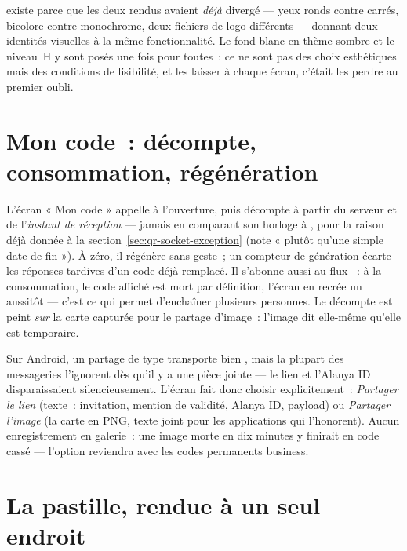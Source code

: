 \begin{note}
 existe parce que les deux rendus avaient \emph{déjà} divergé
--- yeux ronds contre carrés, bicolore contre monochrome, deux fichiers de logo différents
--- donnant deux identités visuelles à la même fonctionnalité. Le fond blanc en thème
sombre et le niveau~H y sont posés une fois pour toutes~: ce ne sont pas des choix
esthétiques mais des conditions de lisibilité, et les laisser à chaque écran, c'était les
perdre au premier oubli.
\end{note}

\section{Mon code~: décompte, consommation, régénération}

L'écran « Mon code » appelle  à l'ouverture, puis décompte à
partir du  serveur et de l'\emph{instant de réception} --- jamais en
comparant son horloge à , pour la raison déjà donnée à la
section~\ref{sec:qr-socket-exception} (note «  plutôt qu'une simple date de
fin »). À zéro, il régénère sans geste~; un compteur de génération écarte les réponses
tardives d'un code déjà remplacé. Il s'abonne aussi au flux ~: à la
consommation, le code affiché est mort par définition, l'écran en recrée un aussitôt ---
c'est ce qui permet d'enchaîner plusieurs personnes. Le décompte est peint \emph{sur} la
carte capturée pour le partage d'image~: l'image dit elle-même qu'elle est temporaire.

\begin{note}
Sur Android, un partage de type  transporte bien , mais
la plupart des messageries l'ignorent dès qu'il y a une pièce jointe --- le lien et
l'Alanya ID disparaissaient silencieusement. L'écran fait donc choisir explicitement~:
\emph{Partager le lien} (texte~: invitation, mention de validité, Alanya ID, payload) ou
\emph{Partager l'image} (la carte en PNG, texte joint pour les applications qui
l'honorent). Aucun enregistrement en galerie~: une image morte en dix minutes y finirait
en code cassé --- l'option reviendra avec les codes permanents business.
\end{note}

\section{La pastille, rendue à un seul endroit}
\label{sec:qr-pastille}

